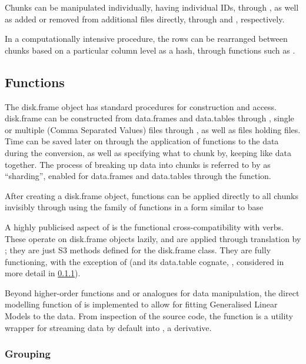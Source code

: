 Chunks can be manipulated individually, having individual IDs, through , as well as added or removed from additional  files directly, through  and , respectively.

In a computationally intensive procedure, the rows can be rearranged between chunks based on a particular column level as a hash, through functions such as .

\subsection{Functions}\label{sec:functions}

The disk.frame object has standard procedures for construction and access.
disk.frame can be constructed from data.frames and data.tables
through , single or
multiple  (Comma Separated Values) files through
, as well as 
files holding  files.
Time can be saved later on through the application of functions to the data during the conversion, as well as specifying what to chunk by, keeping like data together.
The process of breaking up data into chunks is referred to by  as ``sharding'', enabled for data.frames and data.tables through the  function.

After creating a disk.frame object, functions can be applied directly to all chunks invisibly through using the  family of functions in a form similar to base \R{} 

A highly publicised aspect of  is the functional cross-compatibility with  verbs.
These operate on disk.frame objects lazily, and are applied through translation by ; they are just S3 methods defined for the disk.frame class.
They are fully functioning, with the exception of  (and its data.table cognate, , considered in more detail in \cref{sec:spec-cons-group-by}).

Beyond higher-order functions and  or  analogues for data manipulation, the direct modelling function of  is implemented to allow for fitting Generalised Linear Models to the data.
From inspection of the source code, the function is a utility wrapper for streaming  data by default into , a  derivative.

\subsubsection{Grouping}\label{sec:spec-cons-group-by}

